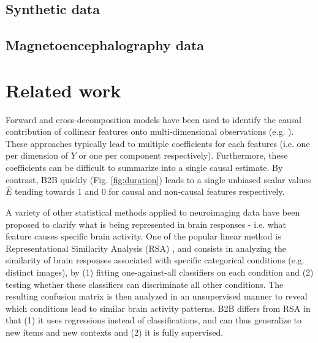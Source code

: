 \documentclass{article}
\begin{document}
\subsection{Synthetic data}
\label{sec:experiment_synthetic}



\subsection{Magnetoencephalography data}
\label{sec:experiment_real}



\section{Related work}

Forward and cross-decomposition models have been used to identify the causal contribution of collinear features onto multi-dimensional observations (e.g. \citep{naselaris2011encoding}). These approaches typically lead to multiple coefficients for each features (i.e. one per dimension of $Y$ or one per component respectively). Furthermore, these coefficients can be difficult to summarize into a single causal estimate. By contrast, B2B quickly (Fig. \ref{fig:duration}) leads to a single unbiased scalar values $\hat E$ tending towards 1 and 0 for causal and non-causal features respectively.

A variety of other statistical methods applied to neuroimaging data have been proposed to clarify what is being represented in brain responses - i.e. what feature causes specific brain activity. One of the popular linear method is Representational Similarity Analysis (RSA) \citep{kriegeskorte2008representational}, and consists in analyzing the similarity of brain responses associated with specific categorical conditions (e.g. distinct images), by (1) fitting one-against-all classifiers on each condition and (2) testing whether these classifiers can discriminate all other conditions. The resulting confusion matrix is then analyzed in an unsupervised manner to reveal which conditions lead to similar brain activity patterns. B2B differs from RSA in that (1) it uses regressions instead of classifications, and can thus generalize to new items and new contexts and (2) it is fully supervised.
\end{document}
